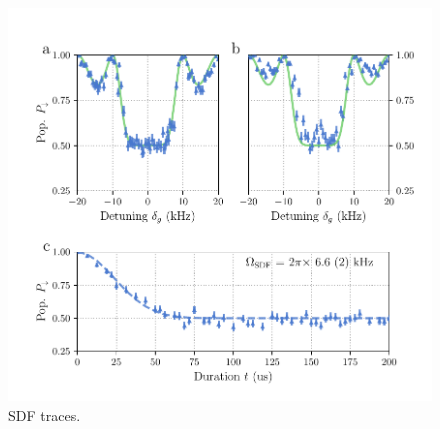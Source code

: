     \begin{figure}
        \begin{center}
        \noindent\includegraphics[width=\linewidth]{
            figures/pdf_figure/sdf.pdf
            }
        \end{center}
        \caption{
            SDF traces. 
            }
        \label{fig:SDF}
    \end{figure}

